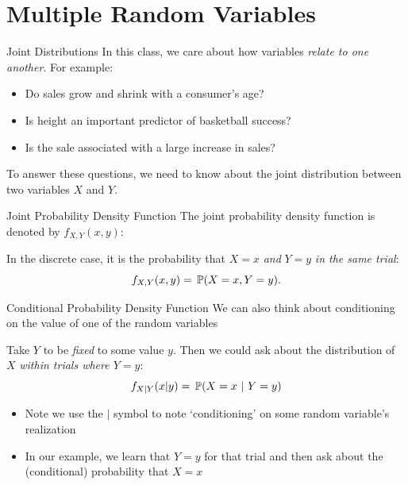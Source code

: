 \documentclass[aspectratio=169,t,11pt,table]{beamer}
\begin{document}
\section{Multiple Random Variables}

\begin{frame}{Joint Distributions}
  In this class, we care about how variables \emph{relate to one another}. For example:
  \begin{itemize}
    \item Do sales grow and shrink with a consumer's age?
    
    \item Is height an important predictor of basketball success?
    
    \item Is the sale associated with a large increase in sales?
  \end{itemize}

  \pause
  \bigskip
  To answer these questions, we need to know about the \alert{joint distribution} between two variables $X$ and $Y$.
\end{frame}

\begin{frame}{Joint Probability Density Function}
  The \alert{joint probability density function} is denoted by $f_{X,Y}(x, y)$:
  
  \bigskip
  In the discrete case, it is the probability that $X = x$ \emph{and} $Y = y$ \emph{in the same trial}:
  \[
    f_{X,Y}(x, y) = \P{X = x, Y = y}.
  \]
\end{frame}

\begin{frame}{Conditional Probability Density Function}
  We can also think about \alert{conditioning} on the value of one of the random variables

  \bigskip
  Take $Y$ to be \emph{fixed} to some value $y$. Then we could ask about the distribution of $X$ \emph{within trials where $Y = y$}:
  \[
    f_{X \vert Y}(x \vert y) = \P{X = x}{Y = y}
  \]

  \pause
  \begin{itemize}
    \item Note we use the $\vert$ symbol to note `conditioning' on some random variable's realization
    
    \pause
    \item In our example, we learn that $Y = y$ for that trial and then ask about the (conditional) probability that $X = x$
  \end{itemize}
\end{frame}
\end{document}
